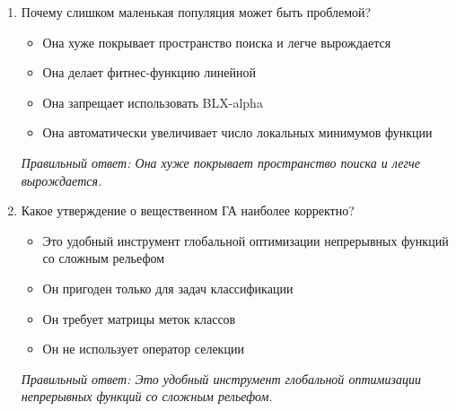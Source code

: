 \begin{enumerate}[label=\textbf{\arabic*.}, leftmargin=0pt, itemsep=1.2em]
\item Почему слишком маленькая популяция может быть проблемой?
\begin{itemize}[label=$\square$, leftmargin=1.5cm, itemsep=0.2em, topsep=0.3em]
\item Она хуже покрывает пространство поиска и легче вырождается
\item Она делает фитнес-функцию линейной
\item Она запрещает использовать BLX-alpha
\item Она автоматически увеличивает число локальных минимумов функции
\end{itemize}
{\small\textit{Правильный ответ: Она хуже покрывает пространство поиска и легче вырождается.}}

\item Какое утверждение о вещественном ГА наиболее корректно?
\begin{itemize}[label=$\square$, leftmargin=1.5cm, itemsep=0.2em, topsep=0.3em]
\item Это удобный инструмент глобальной оптимизации непрерывных функций со сложным рельефом
\item Он пригоден только для задач классификации
\item Он требует матрицы меток классов
\item Он не использует оператор селекции
\end{itemize}
{\small\textit{Правильный ответ: Это удобный инструмент глобальной оптимизации непрерывных функций со сложным рельефом.}}

\end{enumerate}
